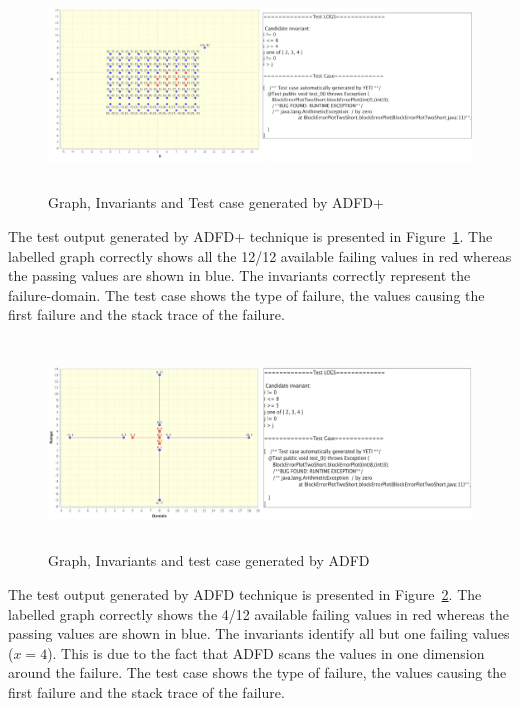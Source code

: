 \begin{figure}[H]
\centering
\includegraphics[width= 12.5cm,height=5.5cm]{chapter7/adfdPlusCombined.png}
\caption{Graph, Invariants and Test case generated by ADFD+}
\label{fig:ADFD+}
\end{figure}


The test output generated by ADFD+ technique is presented in Figure~\ref{fig:ADFD+}. The labelled graph correctly shows all the 12/12 available failing values in red whereas the passing values are shown in blue. The invariants correctly represent the failure-domain. The test case shows the type of failure, the values causing the first failure and the stack trace of the failure.

\begin{figure}[H]
\centering
\includegraphics[width= 12.5cm,height=5.5cm]{chapter7/adfdCombined.png}
\caption{Graph, Invariants and test case generated by ADFD}
\label{fig:ADFD}
\end{figure}

The test output generated by ADFD technique is presented in Figure~\ref{fig:ADFD}. The labelled graph correctly shows the 4/12 available failing values in red whereas the passing values are shown in blue. The invariants identify all but one failing values ($x = 4$). This is due to the fact that ADFD scans the values in one dimension around the failure. The test case shows the type of failure, the values causing the first failure and the stack trace of the failure. 

